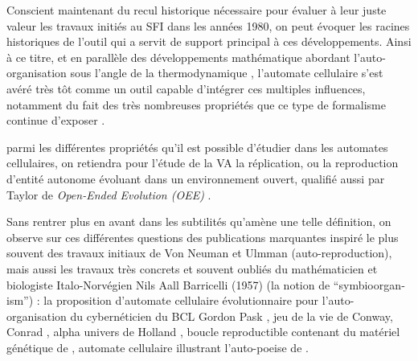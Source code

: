 Conscient maintenant du recul historique nécessaire pour évaluer à leur juste valeur les travaux initiés au SFI dans les années 1980, on peut évoquer les racines historiques de l'outil qui a servit de support principal à ces développements. Ainsi à ce titre, et en parallèle des développements mathématique abordant l'auto-organisation sous l'angle de la thermodynamique , l'automate cellulaire s'est avéré très tôt comme un outil capable d'intégrer ces multiples influences, notamment du fait des très nombreuses propriétés que ce type de formalisme continue d'exposer \autocite{Ganguly2003}. %

parmi les différentes propriétés qu'il est possible d'étudier dans les automates cellulaires, on retiendra pour l'étude de la VA la réplication, ou la reproduction  d'entité autonome évoluant dans un environnement ouvert, qualifié aussi par Taylor de \textit{Open-Ended Evolution (OEE)} . 

Sans rentrer plus en avant dans les subtilités qu'amène une telle définition, on observe sur ces différentes questions des publications marquantes inspiré le plus souvent des travaux initiaux de Von Neuman et Ulmman (auto-reproduction), mais aussi les travaux très concrets et souvent oubliés \autocites[111-130]{Dyson1997}{Fogel1998, Taylor1999, Hackett2014} du mathématicien et biologiste Italo-Norvégien Nils Aall Barricelli (1957) (la notion de \foreignquote{english}{symbioorganism}) : la proposition d'automate cellulaire évolutionnaire pour l'auto-organisation du cybernéticien du BCL Gordon Pask \autocite{Pask1961}, jeu de la vie de Conway, Conrad \textcite{Conrad1970}, alpha univers de Holland \autocite{Holland1976}, boucle reproductible contenant du matériel génétique de \textcite{Langton1984}, automate cellulaire illustrant l'auto-poeise de \textcite{Varela1974,McMullin1997b, McMullin1997, McMullin2004}.

